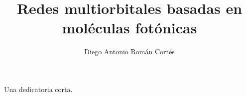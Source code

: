 \documentclass[hyphens]{umemoria}
\author{Diego Antonio Román Cortés}
\title{Redes multiorbitales basadas en moléculas fotónicas}
\begin{document}
\frontmatter
\maketitle

\begin{resumen}

\end{resumen}


\begin{dedicatoria}
Una dedicatoria corta.
\end{dedicatoria}

\begin{thanks}

\end{thanks}

\tableofcontents
\listoftables %
\listoffigures %

\mainmatter
















\begin{appendices}


\end{appendices}
\end{document}
